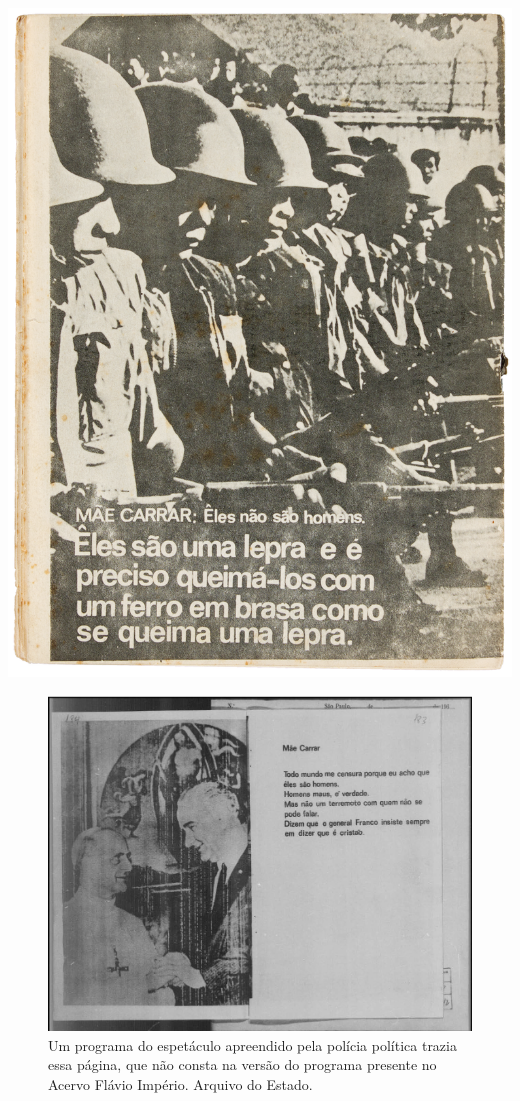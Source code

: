 \includegraphics[width=\columnwidth]{./media/IMAGEM21.png}


\begin{figure}
\includegraphics[width=\columnwidth]{./media/IMAGEM22.jpg}
\caption{Um
programa do espetáculo apreendido pela polícia política trazia essa
página, que não consta na versão do programa presente no Acervo Flávio
Império. Arquivo do Estado.}
\end{figure}

